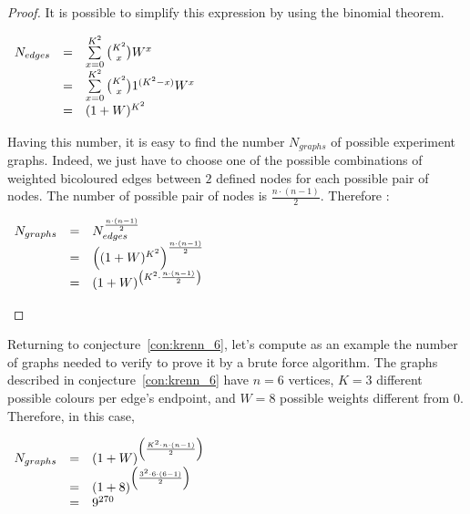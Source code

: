 \begin{proof}
    It is possible to simplify this expression by using the binomial theorem. \cite{wikipediaBinomialTheorem}

    \begin{center}
        $\begin{array}{r c l}
             N_{edges} & = & \sum\limits_{x=0}^{K^2} {K^2 \choose x} W^x               \\
                       & = & \sum\limits_{x=0}^{K^2} {K^2 \choose x} 1^{(K^2 - x)} W^x \\
                       & = & (1 + W)^{K^2}
        \end{array}$
    \end{center}

    Having this number, it is easy to find the number $N_{graphs}$ of possible experiment graphs.
    Indeed, we just have to choose one of the possible combinations of weighted bicoloured edges between $2$ defined nodes for each possible pair of nodes.
    The number of possible pair of nodes is $\frac{n \cdot (n-1)}{2}$.
    Therefore :

    \begin{center}
        $\begin{array}{r c l}
             N_{graphs} & = & N_{edges} ^ {\frac{n \cdot (n-1)}{2}}                  \\
                        & = & \left((1 + W)^{K^2}\right)^{\frac{n \cdot (n-1)}{2}}   \\
                        & = & (1 + W)^{\left({K^2} \cdot \frac{n \cdot (n-1)}{2}\right)} \\
        \end{array}$
    \end{center}
\end{proof}

Returning to conjecture~\ref{con:krenn_6}, let's compute as an example the number of graphs needed to verify to prove it by a brute force algorithm.
The graphs described in conjecture~\ref{con:krenn_6} have $n = 6$ vertices, $K = 3$ different possible colours per edge's endpoint, and $W = 8$ possible weights different from $0$.
Therefore, in this case,

\begin{center}
    $\begin{array}{r c l}
         N_{graphs} & = & (1 + W)^{\left(\frac{K^2 \cdot n \cdot (n-1)}{2}\right)} \\
                    & = & (1 + 8)^{\left(\frac{3^2 \cdot 6 \cdot (6-1)}{2}\right)} \\
                    & = & 9^{270}
    \end{array}$
\end{center}

